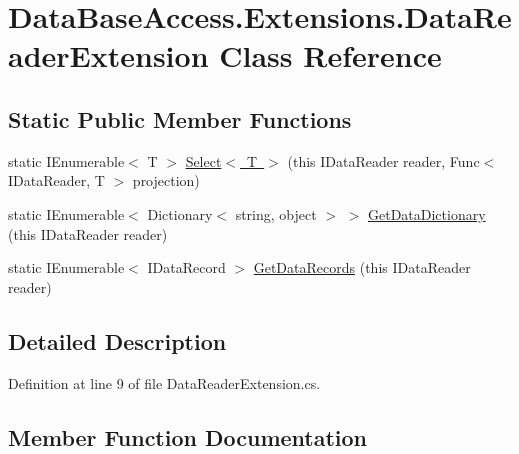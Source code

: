 \hypertarget{classDataBaseAccess_1_1Extensions_1_1DataReaderExtension}{}\section{Data\+Base\+Access.\+Extensions.\+Data\+Reader\+Extension Class Reference}
\label{classDataBaseAccess_1_1Extensions_1_1DataReaderExtension}
\subsection*{Static Public Member Functions}
\begin{DoxyCompactItemize}
\item 
static I\+Enumerable$<$ T $>$ \mbox{\hyperlink{classDataBaseAccess_1_1Extensions_1_1DataReaderExtension_a193141761df2fabaa3ee7eaa8f1a5c27}{Select$<$ T $>$}} (this I\+Data\+Reader reader, Func$<$ I\+Data\+Reader, T $>$ projection)
\item 
static I\+Enumerable$<$ Dictionary$<$ string, object $>$ $>$ \mbox{\hyperlink{classDataBaseAccess_1_1Extensions_1_1DataReaderExtension_a4226624d73927a46ee1ad0a0c8ee59cc}{Get\+Data\+Dictionary}} (this I\+Data\+Reader reader)
\item 
static I\+Enumerable$<$ I\+Data\+Record $>$ \mbox{\hyperlink{classDataBaseAccess_1_1Extensions_1_1DataReaderExtension_a0217950f7209dedd24bec9c56a383087}{Get\+Data\+Records}} (this I\+Data\+Reader reader)
\end{DoxyCompactItemize}


\subsection{Detailed Description}


Definition at line 9 of file Data\+Reader\+Extension.\+cs.



\subsection{Member Function Documentation}
\mbox{\label{classDataBaseAccess_1_1Extensions_1_1DataReaderExtension_a4226624d73927a46ee1ad0a0c8ee59cc}} 
